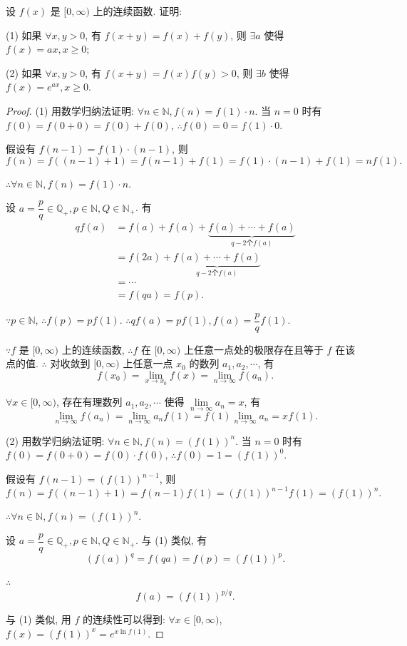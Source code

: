 \documentclass[color=black,device=normal,lang=cn]{elegantnote}
\numberwithin{equation}{section}
\theoremstyle{plain}
\numberwithin{exercise}{exsection}
\begin{document}
\begin{exercise}%
    设 $f(x)$ 是 $[0,\infty)$ 上的连续函数. 证明:

    (1) 如果 $\forall x,y>0$, 有 $f(x+y)=f(x)+f(y)$, 则 $\exists a$ 使得 $f(x)=ax,x\geq0$;

    (2) 如果 $\forall x,y>0$, 有 $f(x+y)=f(x)f(y)>0$, 则 $\exists b$ 使得 $f(x)=e^{ax},x\geq0$.
\end{exercise}
\begin{proof}
    (1) 用数学归纳法证明: $\forall n\in\mathbb{N},f(n)=f(1)\cdot n$. 当 $n=0$ 时有 $f(0)=f(0+0)=f(0)+f(0)$, $\therefore f(0)=0=f(1)\cdot0$.

    假设有 $f(n-1)=f(1)\cdot(n-1)$, 则
    \[f(n)=f((n-1)+1)=f(n-1)+f(1)=f(1)\cdot(n-1)+f(1)=nf(1).\]

    $\therefore\forall n\in\mathbb{N},f(n)=f(1)\cdot n$.

    设 $a=\dfrac{p}{q}\in\mathbb{Q}_+,p\in\mathbb{N},Q\in\mathbb{N}_+$. 有
    \begin{align*}
        qf(a) & =f(a)+f(a)+\underbrace{f(a)+\cdots+f(a)}_{q-2\text{个}f(a)} \\
        & =f(2a)+\underbrace{f(a)+\cdots+f(a)}_{q-2\text{个}f(a)} \\
        & =\cdots \\
        & =f(qa)=f(p).
    \end{align*}

    $\because p\in\mathbb{N}$, $\therefore f(p)=pf(1)$. $\therefore qf(a)=pf(1),f(a)=\dfrac{p}{q}f(1)$.

    $\because f$ 是 $[0,\infty)$ 上的连续函数, $\therefore f$ 在 $[0,\infty)$ 上任意一点处的极限存在且等于 $f$ 在该点的值. $\therefore$ 对收敛到 $[0,\infty)$ 上任意一点 $x_0$ 的数列 $a_1,a_2,\cdots$, 有
    \[f(x_0)=\lim\limits_{x\to x_0}f(x)=\lim\limits_{n\to\infty}f(a_n).\]
    
    $\forall x\in[0,\infty)$, 存在有理数列 $a_1,a_2,\cdots$ 使得 $\lim\limits_{n\to\infty}a_n=x$, 有
    \[\lim\limits_{n\to\infty}f(a_n)=\lim\limits_{n\to\infty}a_nf(1)=f(1)\lim\limits_{n\to\infty}a_n=xf(1).\]

    (2) 用数学归纳法证明: $\forall n\in\mathbb{N},f(n)=(f(1))^n$. 当 $n=0$ 时有 $f(0)=f(0+0)=f(0)\cdot f(0)$, $\therefore f(0)=1=(f(1))^0$.

    假设有 $f(n-1)=(f(1))^{n-1}$, 则
    \[f(n)=f((n-1)+1)=f(n-1)f(1)=(f(1))^{n-1}f(1)=(f(1))^n.\]

    $\therefore\forall n\in\mathbb{N},f(n)=(f(1))^n$.

    设 $a=\dfrac{p}{q}\in\mathbb{Q}_+,p\in\mathbb{N},Q\in\mathbb{N}_+$. 与 (1) 类似, 有
    \[(f(a))^q=f(qa)=f(p)=(f(1))^p.\]

    $\therefore$
    \[f(a)=(f(1))^{p/q}.\]

    与 (1) 类似, 用 $f$ 的连续性可以得到: $\forall x\in[0,\infty)$, $f(x)=(f(1))^x=e^{x\ln f(1)}$.
\end{proof}
\end{document}
